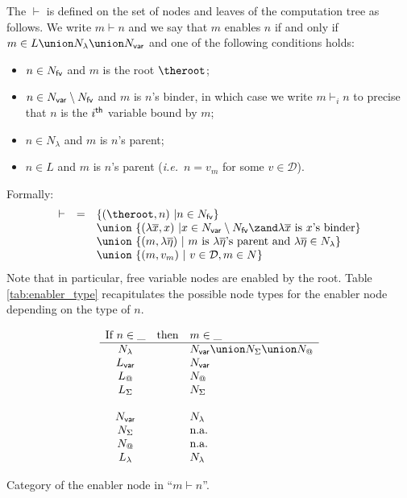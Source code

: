 \begin{definition}[Enabling]
The  $\vdash$ is defined on the set of
nodes and leaves of the computation tree as follows. We write $m \vdash n$ and we say that $m$ enables $n$ if and only if
$m \in L \union N_\lambda \union N_{\sf var}$
and one of the following conditions holds:
\begin{itemize}
\item $n \in N_{\sf fv}$ and $m$ is the root $\theroot$;
\item $n \in N_{\sf var} \setminus N_{\sf fv}$ and
        $m$ is $n$'s binder, in which case we write $m \vdash_i n$ to precise that $n$ is the $i^{\sf th}$ variable bound by $m$;
\item $n\in N_\lambda$ and  $m$ is $n$'s parent;
\item $n \in L$ and $m$ is $n$'s parent ({\it i.e.}\ $n=v_m$ for some $v\in\mathcal{D}$).
\end{itemize}
Formally:
$$ \begin{array}{lcl}
  \vdash & = & \{ (\theroot,n) \ | n \in N_{\sf fv} \} \\
&&\union\  \{ (\lambda \overline{x},x) \ | x \in N_{\sf var}\setminus N_{\sf fv} \zand \lambda\overline{x} \mbox{ is $x$'s binder} \} \\
&& \union\ \{ (m,\lambda\overline\eta) \ | \ m \mbox{ is $\lambda\overline\eta$'s parent and } \lambda\overline\eta \in N_\lambda \} \\
&& \union\ \{ (m,v_m) \ | \ v \in \mathcal{D}, m \in N  \}
\end{array}$$
Note that in particular, free variable nodes are enabled by the root.
Table \ref{tab:enabler_type} recapitulates the possible node types for the enabler node depending on the type of $n$.
\end{definition}


\begin{table}[htbp]
$$
\begin{array}{ccl}
\mbox{If } n\in \_  & \mbox{then} & m\in \_ \\ \hline
N_\lambda & & N_{\sf var} \union N_\Sigma \union N_@ \\
L_{\sf var} & & N_{\sf var} \\
L_@ & &  N_@ \\
L_\Sigma & & N_\Sigma\\
\\
N_{\sf var} & & N_\lambda\\
N_\Sigma & & \mbox{n.a.} \\
N_@ & & \mbox{n.a.} \\
L_\lambda & & N_\lambda\\
\end{array}
$$
\caption[Category of the justifying node]{Category of the enabler node in ``$m\vdash n$''.}
\label{tab:enabler_type}
\end{table}

